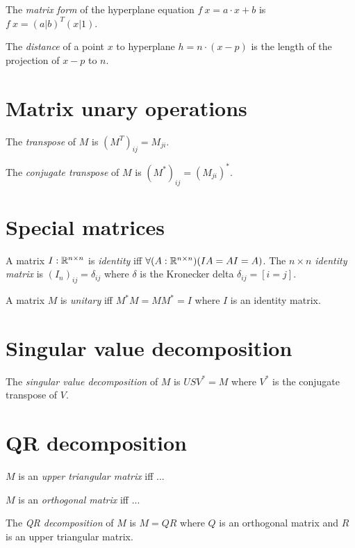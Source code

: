 %
%
The \emph{matrix form} of the hyperplane equation \(f~x = a \cdot x + b\)
is \(f~x = (a|b)^T (x|1)\).

The \emph{distance} of a point \(x\) to hyperplane \(h = n \cdot (x - p)\)
is the length of the projection of \(x-p\) to \(n\).

\section{Matrix unary operations}

The
%
%
%
\emph{transpose} of \(M\) is \((M^T)_{ij} = M_{ji}\).

The
%
%
%
%
\emph{conjugate transpose} of \(M\) is \((M^*)_{ij} = (M_{ji})^*\).

\section{Special matrices}

%
%
A matrix \(I : \mathbb{R}^{n \times n}\) is \emph{identity} iff
\(\forall (A : \mathbb{R}^{n \times n}) (IA = AI = A)\).
The \emph{\(n\times n\) identity matrix} is
\((I_n)_{ij} = \delta_{ij}\) where \(\delta\) is the
%
Kronecker delta \(\delta_{ij} = [i=j]\).

A matrix \(M\) is
%
%
\emph{unitary} iff \(M^*M = MM^* = I\)
where \(I\) is an identity matrix.

\section{Singular value decomposition}

The
%
%
\emph{singular value decomposition} of \(M\) is \(U S V^* = M\) where \(V^*\) is the conjugate transpose of \(V\).

\section{QR decomposition}

\(M\) is an
%
%
\emph{upper triangular matrix} iff ...

\(M\) is an
%
%
\emph{orthogonal matrix} iff ...

The
%
%
\emph{QR decomposition} of \(M\) is \(M = QR\) where
\(Q\) is an orthogonal matrix and
\(R\) is an upper triangular matrix.
